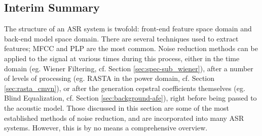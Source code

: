 % 

\subsection{Interim Summary}
% 
The structure of an ASR system is twofold: front-end feature space domain and back-end model space domain.  There are several techniques used to extract features; MFCC and PLP are the most common. Noise reduction methods can be applied to the signal at various times during this process, either in the time domain (eg. Wiener Filtering, cf. Section \ref{sec:spec-sub_wiener}), after a number of levels of processing (eg. RASTA in the power domain, cf. Section \ref{sec:rasta_cmvn}), or after the generation cepstral coefficients themselves (eg. Blind Equalization, cf. Section \ref{sec:background-afe}), right before being passed to the acoustic model.  Those discussed in this section are some of the most established methods of noise reduction, and are incorporated into many ASR systems.  However, this is by no means a comprehensive overview.  

